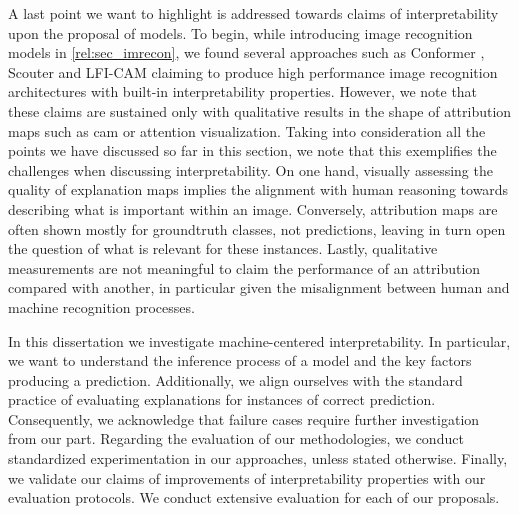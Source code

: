 \noindent A last point we want to highlight is addressed towards claims of interpretability upon 
the proposal of models. To begin, while introducing image recognition models in 
\autoref{rel:sec_imrecon}, we found several approaches such as Conformer 
\autocite{peng2021conformer}, Scouter \autocite{li2021scouter} and LFI-CAM \autocite{lee2021lfi} 
claiming to produce high performance image recognition architectures with built-in interpretability 
properties. However, we note that these claims are sustained only with qualitative results in the 
shape of attribution maps such as \gls{cam} or attention visualization. Taking into consideration 
all the points we have discussed so far in this section, we note that this exemplifies the 
challenges when discussing interpretability. On one hand, visually assessing the quality of 
explanation maps implies the alignment with human reasoning towards describing what is important 
within an image. Conversely, attribution maps are often shown mostly for groundtruth classes, not 
predictions, leaving in turn open the question of what is relevant for these instances. Lastly, 
qualitative measurements are not meaningful to claim the performance of an attribution compared 
with another, in particular given the misalignment between human and machine recognition processes.

\noindent In this dissertation we investigate machine-centered interpretability. In particular, 
we want to understand the inference process of a model and the key factors producing a prediction. 
Additionally, we align ourselves with the standard practice of evaluating explanations for 
instances of correct prediction. Consequently, we acknowledge that failure cases require further 
investigation from our part. Regarding the evaluation of our methodologies, we conduct standardized 
experimentation in our approaches, unless stated otherwise. Finally, we validate our claims of 
improvements of interpretability properties with our evaluation protocols. We conduct extensive 
evaluation for each of our proposals.\\
